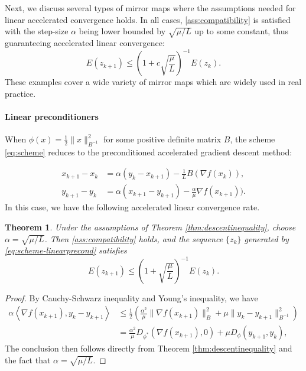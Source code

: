 \documentclass{article}
\newcommand{\dual}[1]{\left\langle {#1} \right\rangle}
\theoremstyle{plain}
\newtheorem{theorem}{Theorem}[section]
\theoremstyle{definition}
\theoremstyle{remark}
\begin{document}
Next, we discuss several types of mirror maps where the assumptions needed for linear accelerated convergence holds. In all cases, \eqref{ass:compatibility} is satisfied with the step-size $\alpha$ being lower bounded by $\sqrt{\mu/L}$ up to some constant, thus guaranteeing accelerated linear convergence:
$$
E(z_{k+1}) \leq \left(1 + c\sqrt{\frac{\mu}{L}}\right)^{-1} E(z_k).
$$
 These examples cover a wide variety of mirror maps which are widely used in real practice.

\paragraph{Linear preconditioners} When $\phi(x)=\frac{1}{2}\|x\|_{B^{-1}}^2$ for some positive definite matrix $B$, the scheme \eqref{eq:scheme} reduces to the preconditioned accelerated gradient descent method:

\begin{equation}\label{eq:scheme-linearprecond}\begin{aligned}
    x_{k+1}-x_k&{}=\alpha(y_k-x_{k+1})-\frac{1}{L} B(\nabla f(x_k)),\\
    y_{k+1}-y_k&{}=\alpha(x_{k+1}-y_{k+1})-\frac{\alpha}{\mu}\nabla f(x_{k+1})).
\end{aligned}
\end{equation}
In this case, we have the following accelerated linear convergence rate.
\begin{theorem} \label{thm:linearprecond}
Under the assumptions of Theorem \ref{thm:descentinequality}, choose $\alpha=\sqrt{\mu/L}$. Then \eqref{ass:compatibility} holds, and the sequence $\{z_k\}$ generated by \eqref{eq:scheme-linearprecond} satisfies
$$
E(z_{k+1}) \leq \left(1 + \sqrt{\frac{\mu}{L}}\right)^{-1} E(z_k).
$$
\end{theorem}
\begin{proof}
    By Cauchy-Schwarz inequality and Young's inequality, we have
    $$\begin{aligned}
        \alpha\dual{\nabla f(x_{k+1}),y_{k}-y_{k+1}}{}&\leq \frac{1}{2}\left(\frac{\alpha^2}{\mu} \|\nabla f(x_{k+1})\|_{B}^2+\mu\|y_k-y_{k+1}\|_{B^{-1}}^2\right)\\
        {}&= \frac{\alpha^2}{\mu}D_{\phi^*}(\nabla f(x_{k+1}),0)+\mu D_\phi(y_{k+1},y_k),
    \end{aligned}$$
    The conclusion then follows directly from Theorem \ref{thm:descentinequality} and the fact that $\alpha=\sqrt{\mu/L}$.
\end{proof}
\end{document}

